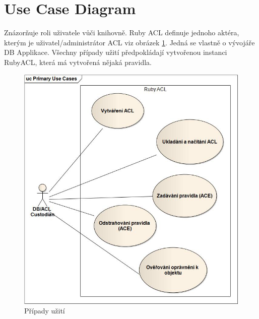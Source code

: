 \documentclass[11pt,twoside,a4paper]{book}
\begin{document}
\section{Use Case Diagram}
Znázorňuje roli uživatele vůči knihovně. Ruby ACL definuje jednoho aktéra, kterým je uživatel/administrátor ACL viz obrázek \ref{fig:usecase}. Jedná se vlastně o vývojáře DB Applikace.
Všechny případy užití předpokládají vytvořenou instanci RubyACL, která má vytvořená nějaká pravidla.
\begin{figure}
\includegraphics[width=15cm]{UseCases.jpg}
\caption{Případy užití}
\label{fig:usecase}
\end{figure}
\end{document}
